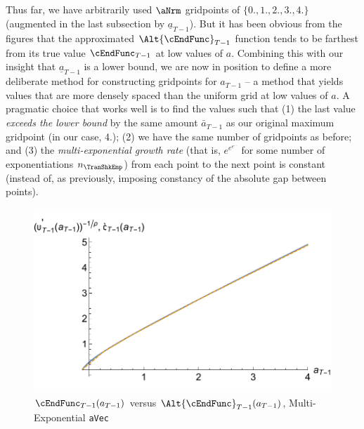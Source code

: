 \documentclass[titlepage, headings=optiontotocandhead]{\econtex}
\begin{document}
Thus far, we have arbitrarily used $\aNrm$ gridpoints of
$\{0.,1.,2.,3.,4.\}$ (augmented in the last subsection by
$\underline{a}_{T-1}$).  But it has been obvious from the figures that
the approximated $\Alt{\cEndFunc}_{T-1}$ function tends to be farthest from its true
value $\cEndFunc_{T-1}$ at low values of ${a}$.  Combining this with our insight that
$\underline{a}_{T-1}$ is a lower bound, we are now in position to
define a more deliberate method for constructing gridpoints for
${a}_{T-1}$ -- a method that yields values that are more densely
spaced than the uniform grid at low values of ${a}$.  A pragmatic
choice that works well is to find the values such that (1) the last
value \textit{exceeds the lower bound} by the same amount $\bar{a}_{T-1}$
as our original maximum gridpoint (in our case, 4.); (2) we have the
same number of gridpoints as before; and (3) the \textit{multi-exponential growth rate} (that is, $e^{e^{e^{...}}}$ for some
number of exponentiations $n_{\TranShkEmp}$) from each point to the next point is
constant (instead of, as previously, imposing constancy of the
absolute gap between points).

\hypertarget{GothVInvVSGothCEEE}{}
\begin{figure}
  \includegraphics{./Figures/GothVInvVSGothCEEE}
  \caption{$\cEndFunc_{T-1}({a}_{T-1})$ versus
    $\Alt{\cEndFunc}_{T-1}({a}_{T-1})$, Multi-Exponential \texttt{aVec}}
  \label{fig:GothVInvVSGothCEE}
\end{figure}
\end{document}

